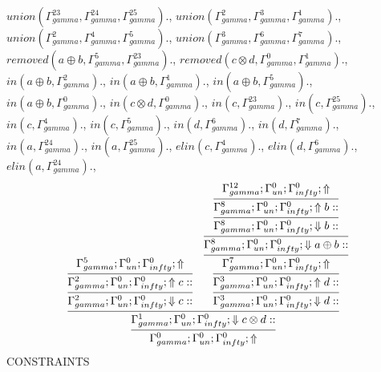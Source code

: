 \documentclass[a4paper, 11pt]{article}
\begin{document}
$union(\Gamma_{gamma}^{23}, \Gamma_{gamma}^{24}, \Gamma_{gamma}^{25}).$, $union(\Gamma_{gamma}^{2}, \Gamma_{gamma}^{3}, \Gamma_{gamma}^{1}).$, $union(\Gamma_{gamma}^{2}, \Gamma_{gamma}^{4}, \Gamma_{gamma}^{5}).$, $union(\Gamma_{gamma}^{3}, \Gamma_{gamma}^{6}, \Gamma_{gamma}^{7}).$, $removed(a \oplus b, \Gamma_{gamma}^{5}, \Gamma_{gamma}^{23}).$, $removed(c \otimes d, \Gamma_{gamma}^{0}, \Gamma_{gamma}^{1}).$, $in(a \oplus b, \Gamma_{gamma}^{2}).$, $in(a \oplus b, \Gamma_{gamma}^{1}).$, $in(a \oplus b, \Gamma_{gamma}^{5}).$, $in(a \oplus b, \Gamma_{gamma}^{0}).$, $in(c \otimes d, \Gamma_{gamma}^{0}).$, $in(c, \Gamma_{gamma}^{23}).$, $in(c, \Gamma_{gamma}^{25}).$, $in(c, \Gamma_{gamma}^{4}).$, $in(c, \Gamma_{gamma}^{5}).$, $in(d, \Gamma_{gamma}^{6}).$, $in(d, \Gamma_{gamma}^{7}).$, $in(a, \Gamma_{gamma}^{24}).$, $in(a, \Gamma_{gamma}^{25}).$, $elin(c, \Gamma_{gamma}^{4}).$, $elin(d, \Gamma_{gamma}^{6}).$, $elin(a, \Gamma_{gamma}^{24}).$, 
\[
\infer{\Gamma_{ gamma}^{0} ; \Gamma_{un}^{0} ; \Gamma_{ infty}^{0} ;  \Uparrow }
{\infer{\Gamma_{ gamma}^{1} ; \Gamma_{un}^{0} ; \Gamma_{ infty}^{0} ;  \Downarrow c \otimes d :: }
{\infer{\Gamma_{ gamma}^{2} ; \Gamma_{un}^{0} ; \Gamma_{ infty}^{0} ;  \Downarrow c :: }
{\infer{\Gamma_{ gamma}^{2} ; \Gamma_{un}^{0} ; \Gamma_{ infty}^{0} ;  \Uparrow c :: }
{\Gamma_{ gamma}^{5} ; \Gamma_{un}^{0} ; \Gamma_{ infty}^{0} ;  \Uparrow }}
&
\infer{\Gamma_{ gamma}^{3} ; \Gamma_{un}^{0} ; \Gamma_{ infty}^{0} ;  \Downarrow d :: }
{\infer{\Gamma_{ gamma}^{3} ; \Gamma_{un}^{0} ; \Gamma_{ infty}^{0} ;  \Uparrow d :: }
{\infer{\Gamma_{ gamma}^{7} ; \Gamma_{un}^{0} ; \Gamma_{ infty}^{0} ;  \Uparrow }
{\infer{\Gamma_{ gamma}^{8} ; \Gamma_{un}^{0} ; \Gamma_{ infty}^{0} ;  \Downarrow a \oplus b :: }
{\infer{\Gamma_{ gamma}^{8} ; \Gamma_{un}^{0} ; \Gamma_{ infty}^{0} ;  \Downarrow b :: }
{\infer{\Gamma_{ gamma}^{8} ; \Gamma_{un}^{0} ; \Gamma_{ infty}^{0} ;  \Uparrow b :: }
{\Gamma_{ gamma}^{12} ; \Gamma_{un}^{0} ; \Gamma_{ infty}^{0} ;  \Uparrow }}}}}}}}
\]
CONSTRAINTS
\end{document}
